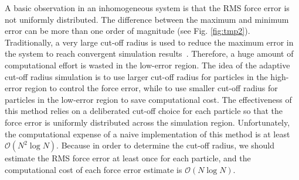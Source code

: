 \documentclass[aps,pre,preprint]{revtex4-1}
\begin{document}

A basic observation in an inhomogeneous system is that the RMS force
error is not uniformly distributed. The difference between the maximum
and minimum error can be more than one order of
magnitude
(see Fig. \ref{fig:tmp2}). Traditionally, a very large cut-off radius is
used to reduce the maximum error in the system to reach convergent
simulation results~\cite{ismail2007application}. Therefore, a huge
amount of computational effort is wasted in the low-error region. The
idea of the adaptive cut-off radius simulation is to use larger
cut-off radius for particles in the high-error region to control the
force error, while to use smaller cut-off radius for particles in the
low-error region to save computational cost.  The effectiveness of this
method relies on a deliberated cut-off choice for each particle so
that the force error is uniformly distributed across the simulation
region.  Unfortunately, the computational expense of a naive
implementation of this method is at least $\mathcal O(N^2\log N)$.
Because in order to determine the cut-off radius, we should estimate the RMS
force error at least once for each particle, and the computational
cost of each force error estimate is $\mathcal O(N \log N)$.


\end{document}
